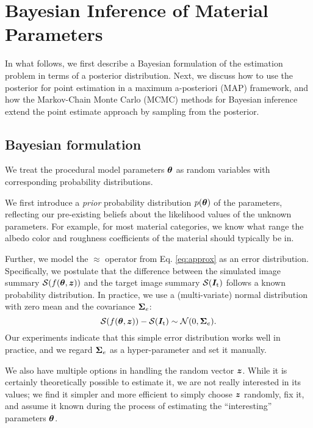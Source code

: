 \section{Bayesian Inference of Material Parameters}
\label{sec:bayesian:param}

In what follows, we first describe a Bayesian formulation of the estimation problem in terms of a posterior distribution. Next, we discuss how to use the posterior for point estimation in a maximum a-posteriori (MAP) framework, and how the Markov-Chain Monte Carlo (MCMC) methods for Bayesian inference extend the point estimate approach by sampling from the posterior.


\subsection{Bayesian formulation}
\label{ssec:point_sec}

We treat the procedural model parameters $\bm\theta$ as random variables with corresponding probability distributions.

We first introduce a \emph{prior} probability distribution $p(\bm\theta)$ of the parameters, reflecting our pre-existing beliefs about the likelihood values of the unknown parameters. For example, for most material categories, we know what range the albedo color and roughness coefficients of the material should typically be in.

Further, we model the $\approx$ operator from Eq. \eqref{eq:approx} as an error distribution. Specifically, we postulate that the difference between the simulated image summary $\mathcal{S}(f(\bm\theta, \bm{z}))$ and the target image summary $\mathcal{S}(\bm{I}_\mathrm{t})$ follows a known probability distribution.
In practice, we use a (multi-variate) normal distribution with zero mean and the covariance $\bm\Sigma_e$:
\begin{equation}
	\mathcal{S}(f(\bm\theta, \bm{z})) - \mathcal{S}(\bm{I}_\mathrm{t}) \sim \mathcal{N}(0, \bm\Sigma_e).
\end{equation}
Our experiments indicate that this simple error distribution works well in practice, and we regard $\bm\Sigma_e$ as a hyper-parameter and set it manually.

We also have multiple options in handling the random vector $\bm{z}$. While it is certainly theoretically possible to estimate it, we are not really interested in its values;  we find it simpler and more efficient to simply choose $\bm{z}$ randomly, fix it, and assume it known during the process of estimating the ``interesting'' parameters $\bm\theta$.

